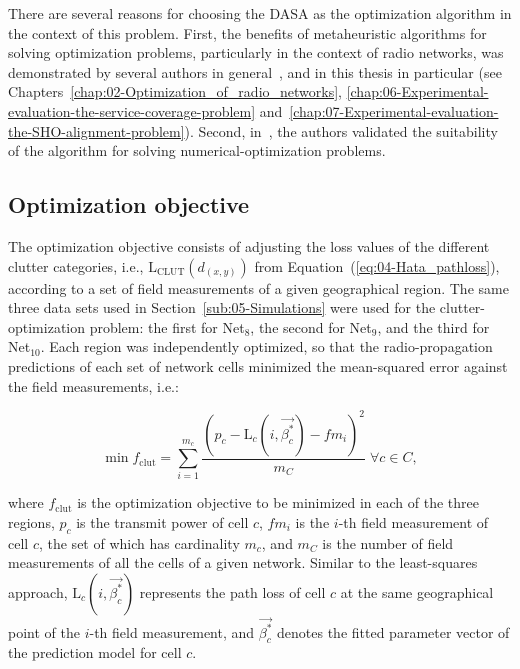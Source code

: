 There are several reasons for choosing the DASA as the optimization
algorithm in the context of this problem. First, the benefits of metaheuristic
algorithms for solving optimization problems, particularly in the
context of radio networks, was demonstrated by several authors in
general~\cite{Benedicic_Balancing_downlink_uplink_soft_handover_areas_in_UMTS_networks:2012,Garcia-Lozano_Metaheuristic_procedure_to_optimize_transmission_delays_in_DVB-T_single_frequency_networks:2011,Huang_Online_propagation_model_correction_based_on_PSO_algorithm_in_LTE_SON_system:2012,Malla_Energy_efficient_resource_allocation_in_OFDMA_networks_using_ant_colony_optimization:2012},
and in this thesis in particular (see Chapters~\ref{chap:02-Optimization_of_radio_networks},
\ref{chap:06-Experimental-evaluation-the-service-coverage-problem}
and~\ref{chap:07-Experimental-evaluation-the-SHO-alignment-problem}).
Second, in~\cite{Korosec-The_differential_ant_stigmergy_algorithm:2012},
the authors validated the suitability of the algorithm for solving
numerical-optimization problems.


\subsection{Optimization objective \label{sub:Optimization-objective}}

The optimization objective consists of adjusting the loss values of
the different clutter categories, i.e., $\mathrm{L}{}_{\mathrm{CLUT}}(d_{(x,y)})$
from Equation~(\ref{eq:04-Hata_pathloss}), according to a set of
field measurements of a given geographical region. The same three
data sets used in Section~\ref{sub:05-Simulations} were used for
the clutter-optimization problem: the first for Net$_{8}$, the second
for Net$_{9}$, and the third for Net$_{10}$. Each region was independently
optimized, so that the radio-propagation predictions of each set of
network cells minimized the mean-squared error against the field measurements,
i.e.:

\begin{equation}
\min f_{\mathrm{clut}}=\sum_{i=1}^{m_{c}}\frac{(p_{c}-\mathrm{L}{}_{c}(i,\vec{\beta_{c}^{*}})-fm_{i})^{2}}{m_{C}}\;\forall c\in C,\label{eq:05-Mean-squared_error}
\end{equation}


\noindent where $f_{\mathrm{clut}}$ is the optimization objective
to be minimized in each of the three regions, $p_{c}$ is the transmit
power of cell $c$, $fm_{i}$ is the $i$-th field measurement of
cell $c$, the set of which has cardinality $m_{c}$, and $m_{C}$
is the number of field measurements of all the cells of a given network.
Similar to the least-squares approach, $\mathrm{L}{}_{c}(i,\vec{\beta_{c}^{*}})$
represents the path loss of cell $c$ at the same geographical point
of the $i$-th field measurement, and $\vec{\beta_{c}^{*}}$ denotes
the fitted parameter vector of the prediction model for cell $c$.

